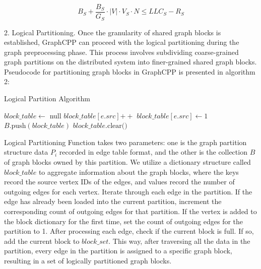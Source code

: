 \documentclass[lettersize,journal]{IEEEtran} %
\begin{document}
\begin{equation}
    B_S + \frac{B_S}{G_S} \cdot \lvert V \rvert \cdot V_S \cdot N \leq LLC_S - R_S
    \end{equation}

2. Logical Partitioning. Once the granularity of shared graph blocks is established, GraphCPP can proceed with the logical partitioning during the graph preprocessing phase. This process involves subdividing coarse-grained graph partitions on the distributed system into finer-grained shared graph blocks. Pseudocode for partitioning graph blocks in GraphCPP is presented in algorithm 2:

\begin{algorithm}
\caption{Logical Partition Algorithm}
\begin{algorithmic}[1]
 
    \State $block\_table \gets$ null
      
            \State $block\_table[e.src] \mathrel{+{+}}$
        \Else
            \State $block\_table[e.src] \gets 1$
        \EndIf
            \State $B.\text{push}(block\_table)$
            \State $block\_table.\text{clear()}$
        \EndIf
    \EndFor
\EndFunction
\end{algorithmic}
\end{algorithm}

Logical Partitioning Function takes two parameters: one is the graph partition structure data $P_i$ recorded in edge table format, and the other is the collection $B$ of graph blocks owned by this partition. We utilize a dictionary structure called $block\_table$ to aggregate information about the graph blocks, where the keys record the source vertex IDs of the edges, and values record the number of outgoing edges for each vertex. Iterate through each edge in the partition. If the edge has already been loaded into the current partition, increment the corresponding count of outgoing edges for that partition. If the vertex is added to the block dictionary for the first time, set the count of outgoing edges for the partition to 1. After processing each edge, check if the current block is full. If so, add the current block to $block\_set$. This way, after traversing all the data in the partition, every edge in the partition is assigned to a specific graph block, resulting in a set of logically partitioned graph blocks.
\end{document}
